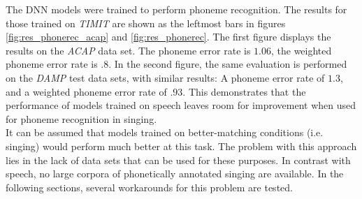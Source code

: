 The DNN models were trained to perform phoneme recognition. The results for those trained on \textit{TIMIT} are shown as the leftmost bars in figures \ref{fig:res_phonerec_acap} and \ref{fig:res_phonerec}. The first figure displays the results on the \textit{ACAP} data set. The phoneme error rate is $1.06$, the weighted phoneme error rate is $.8$. In the second figure, the same evaluation is performed on the \textit{DAMP} test data sets, with similar results: A phoneme error rate of $1.3$, and a weighted phoneme error rate of $.93$. This demonstrates that the performance of models trained on speech leaves room for improvement when used for phoneme recognition in singing.\\
It can be assumed that models trained on better-matching conditions (i.e. singing) would perform much better at this task. The problem with this approach lies in the lack of data sets that can be used for these purposes. In contrast with speech, no large corpora of phonetically annotated singing are available. In the following sections, several workarounds for this problem are tested.


